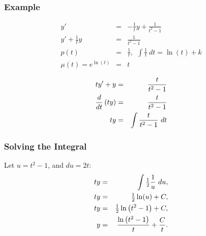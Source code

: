 \begin{frame}
  \frametitle{Example}

  \vspace*{-3em}
  \begin{eqnarray*}
    y' & = & -\frac{1}{t} y + \frac{1}{t^2 -1} \\
    y' + \frac{1}{t} y & = & \frac{1}{t^2 -1} \\
    p(t) & = & \frac{1}{t}, ~~  \int \frac{1}{t} ~ dt  =  \ln(t) + k \\
    \mu ( t ) = e^{\ln(t)} & = & t
  \end{eqnarray*}

  \begin{eqnarray*}
    t y' + y & = & \frac{t}{t^2-1} \\
    \frac{d}{dt} \lp t y \rp & = & \frac{t}{t^2-1} \\
    t y & = & \int \frac{t}{t^2-1} ~ dt
%
%
%
 \end{eqnarray*}

\end{frame}


\begin{frame}
  \frametitle{Solving the Integral}

  Let $u=t^2-1$, and $du=2t$:
  \begin{eqnarray*}
    ty & = & \int \mbox{$\frac{1}{2}$} \frac{1}{u} ~ du, \\
    t y & = & \mbox{$\frac{1}{2}$} \ln(u) + C, \\
    t y & = & \mbox{$\frac{1}{2}$} \ln \left( t^2 - 1 \right) + C, \\
    y & = & \frac{\ln\left( t^2-1 \right)}{t} + \frac{C}{t}.
  \end{eqnarray*}

\end{frame}


